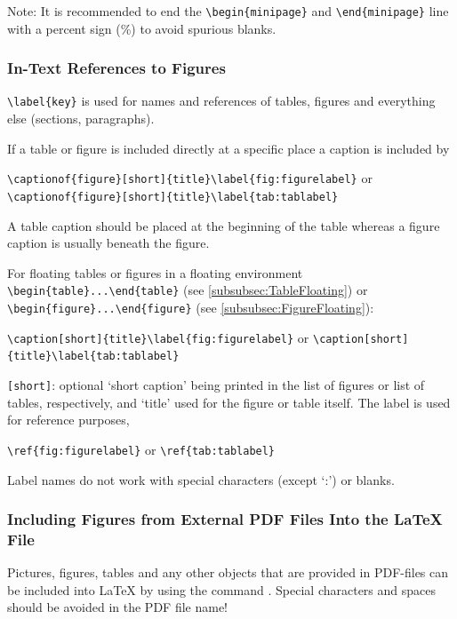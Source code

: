Note: It is recommended to end the \verb|\begin{minipage}| and \verb|\end{minipage}| line with a
percent sign (\%) to avoid spurious blanks.

\subsubsection{In-Text References to Figures}
\verb|\label{key}| is used for names and references of tables, figures and everything else (\eg sections,
paragraphs).

If a table or figure is included directly at a specific place a caption is included by

\verb|\captionof{figure}[short]{title}\label{fig:figurelabel}| or \newline
\verb|\captionof{figure}[short]{title}\label{tab:tablabel}|

A table caption should be placed at the beginning of the table whereas a figure caption is usually
beneath the figure.

For floating tables or figures in a floating environment \verb|\begin{table}...\end{table}| (see
\ref{subsubsec:TableFloating}) or \verb|\begin{figure}...\end{figure}| (see \ref{subsubsec:FigureFloating}):

\verb|\caption[short]{title}\label{fig:figurelabel}| or \newline
\verb|\caption[short]{title}\label{tab:tablabel}|

\verb|[short]|: optional `short caption' being printed in the list of figures or list of tables, respectively,
and `title' used for the figure or table itself. The label is used for reference purposes, \eg

\verb|\ref{fig:figurelabel}| or \verb|\ref{tab:tablabel}|

Label names do not work with special characters (except `:') or blanks.

\subsubsection{Including Figures from External PDF Files Into the \LaTeX{} File}\label{sec:includepdfs}
Pictures, figures, tables and any other objects that are provided in PDF-files can be included into \LaTeX{}
by using the command . Special characters and spaces should be avoided
in the PDF file name!
\par\bigskip

